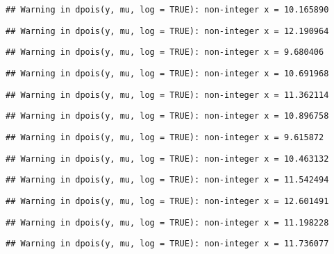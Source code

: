 \documentclass[
]{article}
\begin{document}
\begin{verbatim}
## Warning in dpois(y, mu, log = TRUE): non-integer x = 10.165890
\end{verbatim}

\begin{verbatim}
## Warning in dpois(y, mu, log = TRUE): non-integer x = 12.190964
\end{verbatim}

\begin{verbatim}
## Warning in dpois(y, mu, log = TRUE): non-integer x = 9.680406
\end{verbatim}

\begin{verbatim}
## Warning in dpois(y, mu, log = TRUE): non-integer x = 10.691968
\end{verbatim}

\begin{verbatim}
## Warning in dpois(y, mu, log = TRUE): non-integer x = 11.362114
\end{verbatim}

\begin{verbatim}
## Warning in dpois(y, mu, log = TRUE): non-integer x = 10.896758
\end{verbatim}

\begin{verbatim}
## Warning in dpois(y, mu, log = TRUE): non-integer x = 9.615872
\end{verbatim}

\begin{verbatim}
## Warning in dpois(y, mu, log = TRUE): non-integer x = 10.463132
\end{verbatim}

\begin{verbatim}
## Warning in dpois(y, mu, log = TRUE): non-integer x = 11.542494
\end{verbatim}

\begin{verbatim}
## Warning in dpois(y, mu, log = TRUE): non-integer x = 12.601491
\end{verbatim}

\begin{verbatim}
## Warning in dpois(y, mu, log = TRUE): non-integer x = 11.198228
\end{verbatim}

\begin{verbatim}
## Warning in dpois(y, mu, log = TRUE): non-integer x = 11.736077
\end{verbatim}
\end{document}
